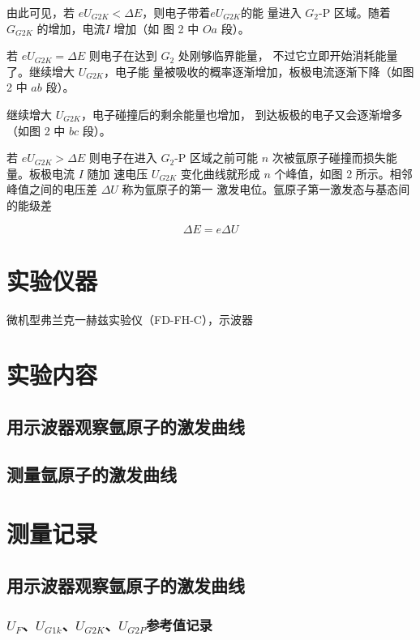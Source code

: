 \documentclass[a4paper,UTF8]{ctexart}
\begin{document}
由此可见，若 $e U_{G2K}<\Delta E$，则电子带着$e U_{G2K}$的能
量进入 $G_{2}$-P 区域。随着 $G_{G2K}$ 的增加，电流$I$ 增加（如
图 2 中 $Oa$ 段）。

若 $e U_{G2K}=\Delta E$ 则电子在达到 $G_2$ 处刚够临界能量，
不过它立即开始消耗能量了。继续增大 $U_{G2K}$，电子能
量被吸收的概率逐渐增加，板极电流逐渐下降（如图
2 中 $ab$ 段）。

继续增大 $U_{G2K}$，电子碰撞后的剩余能量也增加，
到达板极的电子又会逐渐增多（如图 2 中 $bc$ 段）。

若 $e U_{G2K}>\Delta E$ 则电子在进入 $G_2$-P 区域之前可能 $n$ 次被氩原子碰撞而损失能量。板极电流 $I$ 随加
速电压 $U_{G2K}$ 变化曲线就形成 $n$ 个峰值，如图 2 所示。相邻峰值之间的电压差
$\Delta U$ 称为氩原子的第一
激发电位。氩原子第一激发态与基态间的能级差

\begin{equation}
    \Delta E = e \Delta U
\end{equation}

\section{实验仪器}

微机型弗兰克一赫兹实验仪（FD-FH-C），示波器

\section{实验内容}

\subsection{用示波器观察氩原子的激发曲线}

\subsection{测量氩原子的激发曲线}

\section{测量记录}

\subsection{用示波器观察氩原子的激发曲线}

\subsubsection{$U_F$、$U_{G1k}$、$U_{G2K}$、$U_{G2P}$参考值记录}
\end{document}
